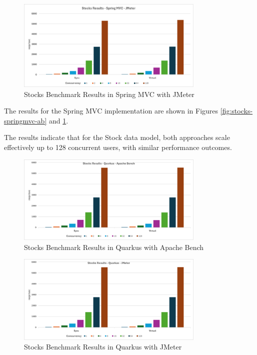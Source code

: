 \documentclass[../ppG48.tex]{subfiles}
\begin{document}
\begin{figure}[h] \centering \includegraphics[width=0.8\textwidth]{../Graphs/stocks-springmvc-jmeter.png} \caption{Stocks Benchmark Results in Spring MVC with JMeter} \label{fig:stocks-springmvc-jmeter} \end{figure}

\vspace{4cm}

The results for the Spring MVC implementation are shown in Figures \ref{fig:stocks-springmvc-ab} and \ref{fig:stocks-springmvc-jmeter}. 

The results indicate that for the Stock data model, both approaches scale effectively up to 128 concurrent users, with similar performance outcomes.

\begin{figure}[hbt!]
\centering 
\includegraphics[width=0.8\textwidth]{../Graphs/stocks-quarkus-ab.png}
 \caption{Stocks Benchmark Results in Quarkus with Apache Bench}
  \label{fig:stocks-quarkus-ab} 
\end{figure}

\begin{figure}[hbt!]
     \centering 
     \includegraphics[width=0.8\textwidth]{../Graphs/stocks-quarkus-jmeter.png} 
     \caption{Stocks Benchmark Results in Quarkus with JMeter}
     \label{fig:stocks-quarkus-jmeter}
\end{figure}
\end{document}
